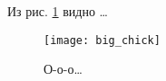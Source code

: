 \documentclass{article}
\begin{document}
Из рис. \ref{fig:chick} видно \dots
\begin{figure}
\centering
\texttt{[image: big\_chick]}
\caption{О-о-о\dots}\label{fig:chick}
\end{figure}
\end{document}
